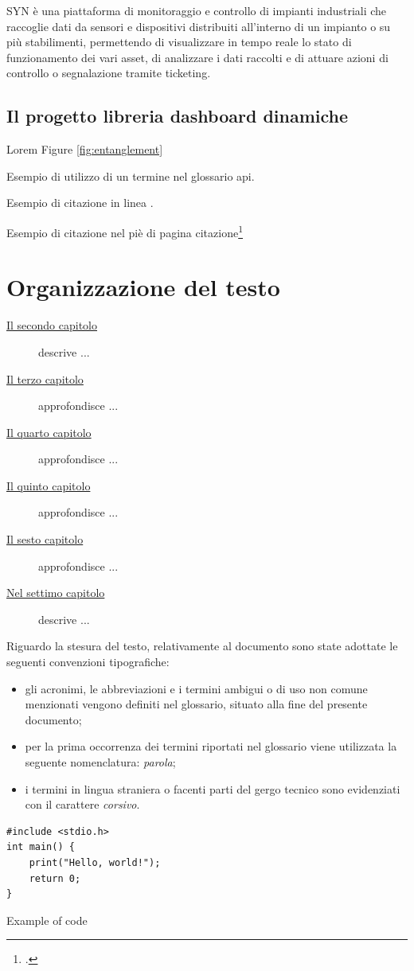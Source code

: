 SYN è una piattaforma di monitoraggio e controllo di impianti industriali che raccoglie dati da sensori e dispositivi
distribuiti all'interno di un impianto o su più stabilimenti, permettendo di visualizzare in tempo reale lo stato di
funzionamento dei vari asset, di analizzare i dati raccolti e di attuare azioni di controllo o segnalazione tramite 
ticketing.

\subsection{Il progetto libreria dashboard dinamiche}



Lorem Figure \ref{fig:entanglement}

Esempio di utilizzo di un termine nel glossario \gls{api}.

Esempio di citazione in linea \cite{site:agile-manifesto}.

Esempio di citazione nel piè di pagina citazione\footcite{womak:lean-thinking}

\lipsum[1-2]

\section{Organizzazione del testo}
\begin{description}
    \item[{\hyperref[chap:processi-metodologie]{Il secondo capitolo}}] descrive ...
    
    \item[{\hyperref[chap:descrizione-stage]{Il terzo capitolo}}] approfondisce ...
    
    \item[{\hyperref[chap:analisi-requisiti]{Il quarto capitolo}}] approfondisce ...
    
    \item[{\hyperref[chap:progettazione-codifica]{Il quinto capitolo}}] approfondisce ...
    
    \item[{\hyperref[chap:verifica-validazione]{Il sesto capitolo}}] approfondisce ...
    
    \item[{\hyperref[chap:conclusioni]{Nel settimo capitolo}}] descrive ...
\end{description}

Riguardo la stesura del testo, relativamente al documento sono state adottate le seguenti convenzioni tipografiche:
\begin{itemize}
	\item gli acronimi, le abbreviazioni e i termini ambigui o di uso non comune menzionati vengono definiti nel glossario, situato alla fine del presente documento;
	\item per la prima occorrenza dei termini riportati nel glossario viene utilizzata la seguente nomenclatura: \textit{parola}\glox\gloxspacing;
	\item i termini in lingua straniera o facenti parti del gergo tecnico sono evidenziati con il carattere \textit{corsivo}.
\end{itemize}

\begin{listing}[H]
\begin{verbatim}
#include <stdio.h>
int main() {
    print("Hello, world!");
    return 0;
}
\end{verbatim}
\caption{Example of code}
\label{listing:a}
\end{listing}

\newpage